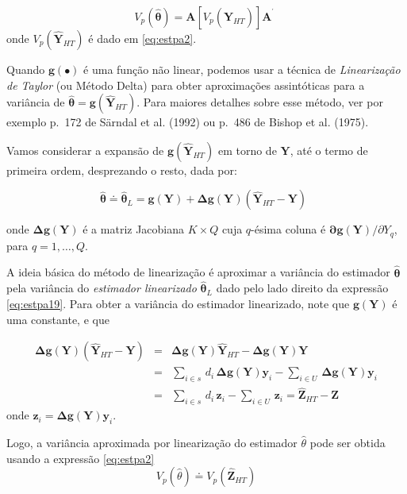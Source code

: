 \documentclass[
  12pt,
  brazilian,
]{book}
\theoremstyle{definition}
\theoremstyle{definition}
\theoremstyle{definition}
\theoremstyle{definition}
\theoremstyle{remark}
\begin{document}
\[
V_{p}\left( \mathbf{\widehat{\theta}} \right) = \mathbf{A} \left[ V_{p} \left( \mathbf{\widehat{Y}}_{HT} \right) \right] \mathbf{A}^{^{\prime }} \,\,
\]
onde \(V_{p} \left( \mathbf{\widehat{Y}}_{HT}\right)\) é dado em \eqref{eq:estpa2}.

Quando \(\mathbf{g}(\bullet)\) é uma função não linear, podemos usar a técnica de \emph{Linearização de Taylor} (ou Método Delta) para obter aproximações assintóticas para a variância de \(\mathbf{ \widehat{\theta}} = \mathbf{g} \left( \widehat{\mathbf{Y}}_{HT}\right)\). Para maiores detalhes sobre esse método, ver por exemplo p.~172 de Särndal et al. (1992) ou p.~486 de Bishop et al. (1975).

Vamos considerar a expansão de \(\mathbf{g} \left( \mathbf{\widehat{Y}}_{HT} \right)\) em torno de \(\mathbf{Y}\), até o termo de primeira ordem, desprezando o resto, dada por:

\begin{equation}
\mathbf{\widehat{\theta} \doteq  \widehat{\theta}}_{L} = \mathbf{g(Y) + \Delta g(Y)} \left( \mathbf{\widehat{Y}}_{HT} - \mathbf{Y} \right) \,\,\, \label{eq:estpa19}
\end{equation}

onde \(\mathbf{\Delta g(Y)}\) é a matriz Jacobiana \(K \times Q\) cuja \(q\)-ésima coluna é \(\mathbf{\partial g(Y)/}\partial Y_{q}\), para \(q=1,\ldots, Q\).

A ideia básica do método de linearização é aproximar a variância do estimador \(\mathbf{\widehat{\theta}}\) pela variância do \emph{estimador linearizado} \(\mathbf{\widehat{\theta}}_L\) dado pelo lado direito da expressão \eqref{eq:estpa19}. Para obter a variância do estimador linearizado, note que \(\mathbf{g(Y)}\) é uma constante, e que

\[
\begin{array}{lll}
\mathbf{\Delta g(Y)} \left( \mathbf{\widehat{Y}}_{HT} - \mathbf{Y} \right) & = & \mathbf{\Delta g(Y)} \mathbf{\widehat{Y}}_{HT} - \mathbf{\Delta g(Y)} \mathbf{Y} \\  & = & \sum_{i \in s} \, d_i \, \mathbf{\Delta g(Y)} \mathbf{y}_{i} -
       \sum_{i \in U} \, \mathbf{\Delta g(Y)} \mathbf{y}_{i} \\
 & = & \sum_{i \in s} \, d_i \, \mathbf{z}_{i} - \sum_{i \in U} \, \mathbf{z}_{i} = \mathbf{\widehat{Z}}_{HT} - \mathbf{Z}
\end{array}
\]
onde \(\mathbf{z}_{i} = \mathbf{\Delta g(Y)} \mathbf{y}_{i}\).

Logo, a variância aproximada por linearização do estimador \(\widehat{\theta}\) pode ser obtida usando a expressão \eqref{eq:estpa2}
\[
 V_p \left( \widehat{\theta} \right) \doteq V_p \left( \mathbf{\widehat{Z}}_{HT} \right) 
\]
\end{document}
